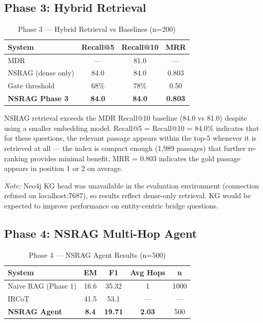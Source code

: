 \documentclass[conference]{IEEEtran}
\begin{document}
\subsection{Phase 3: Hybrid Retrieval}

\begin{table}[h]
\centering
\caption{Phase 3 — Hybrid Retrieval vs Baselines (n=200)}
\label{tab:phase3}
\begin{tabular}{lccc}
\toprule
\textbf{System} & \textbf{Recall@5} & \textbf{Recall@10} & \textbf{MRR} \\
\midrule
MDR \cite{xiong2021mdr} & — & 81.0 & — \\
NSRAG (dense only) & 84.0 & 84.0 & 0.803 \\
Gate threshold & 68\% & 78\% & 0.50 \\
\midrule
\textbf{NSRAG Phase 3} & \textbf{84.0} & \textbf{84.0} & \textbf{0.803} \\
\bottomrule
\end{tabular}
\end{table}

NSRAG retrieval exceeds the MDR Recall@10 baseline (84.0 vs 81.0) despite using a smaller embedding model. Recall@5 = Recall@10 = 84.0\% indicates that for these questions, the relevant passage appears within the top-5 whenever it is retrieved at all — the index is compact enough (1,989 passages) that further re-ranking provides minimal benefit. MRR = 0.803 indicates the gold passage appears in position 1 or 2 on average.

\textit{Note:} Neo4j KG head was unavailable in the evaluation environment (connection refused on localhost:7687), so results reflect dense-only retrieval. KG would be expected to improve performance on entity-centric bridge questions.

\subsection{Phase 4: NSRAG Multi-Hop Agent}

\begin{table}[h]
\centering
\caption{Phase 4 — NSRAG Agent Results (n=500)}
\label{tab:phase4}
\begin{tabular}{lcccc}
\toprule
\textbf{System} & \textbf{EM} & \textbf{F1} & \textbf{Avg Hops} & \textbf{n} \\
\midrule
Naive RAG (Phase 1) & 16.6 & 35.32 & 1 & 1000 \\
IRCoT \cite{trivedi2022interleaving} & 41.5 & 53.1 & — & — \\
\textbf{NSRAG Agent} & \textbf{8.4} & \textbf{19.71} & \textbf{2.03} & 500 \\
\bottomrule
\end{tabular}
\end{table}
\end{document}
